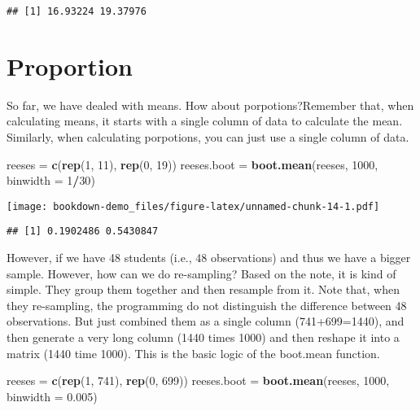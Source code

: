 \documentclass[]{book}
\newenvironment{Shaded}{\begin{snugshade}}{\end{snugshade}}
\newcommand{\DataTypeTok}[1]{\textcolor[rgb]{0.13,0.29,0.53}{#1}}
\newcommand{\DecValTok}[1]{\textcolor[rgb]{0.00,0.00,0.81}{#1}}
\newcommand{\FloatTok}[1]{\textcolor[rgb]{0.00,0.00,0.81}{#1}}
\newcommand{\KeywordTok}[1]{\textcolor[rgb]{0.13,0.29,0.53}{\textbf{#1}}}
\newcommand{\NormalTok}[1]{#1}
\newcommand{\OperatorTok}[1]{\textcolor[rgb]{0.81,0.36,0.00}{\textbf{#1}}}
\newcommand{\StringTok}[1]{\textcolor[rgb]{0.31,0.60,0.02}{#1}}
\begin{document}
\begin{verbatim}
## [1] 16.93224 19.37976
\end{verbatim}

\hypertarget{proportion}{%
\section{Proportion}\label{proportion}}

So far, we have dealed with means. How about porpotions?Remember that, when calculating means, it starts with a single column of data to calculate the mean. Similarly, when calculating porpotions, you can just use a single column of data.

\begin{Shaded}
\begin{Highlighting}[]
\NormalTok{reeses =}\StringTok{ }\KeywordTok{c}\NormalTok{(}\KeywordTok{rep}\NormalTok{(}\DecValTok{1}\NormalTok{, }\DecValTok{11}\NormalTok{), }\KeywordTok{rep}\NormalTok{(}\DecValTok{0}\NormalTok{, }\DecValTok{19}\NormalTok{))}
\NormalTok{reeses.boot =}\StringTok{ }\KeywordTok{boot.mean}\NormalTok{(reeses, }\DecValTok{1000}\NormalTok{, }\DataTypeTok{binwidth =} \DecValTok{1}\OperatorTok{/}\DecValTok{30}\NormalTok{)}
\end{Highlighting}
\end{Shaded}

\texttt{[image: bookdown-demo\_files/figure-latex/unnamed-chunk-14-1.pdf]}

\begin{verbatim}
## [1] 0.1902486 0.5430847
\end{verbatim}

However, if we have 48 students (i.e., 48 observations) and thus we have a bigger sample. However, how can we do re-sampling? Based on the note, it is kind of simple. They group them together and then resample from it. Note that, when they re-sampling, the programming do not distinguish the difference between 48 observations. But just combined them as a single column (741+699=1440), and then generate a very long column (1440 times 1000) and then reshape it into a matrix (1440 time 1000). This is the basic logic of the boot.mean function.

\begin{Shaded}
\begin{Highlighting}[]
\NormalTok{reeses =}\StringTok{ }\KeywordTok{c}\NormalTok{(}\KeywordTok{rep}\NormalTok{(}\DecValTok{1}\NormalTok{, }\DecValTok{741}\NormalTok{), }\KeywordTok{rep}\NormalTok{(}\DecValTok{0}\NormalTok{, }\DecValTok{699}\NormalTok{))}
\NormalTok{reeses.boot =}\StringTok{ }\KeywordTok{boot.mean}\NormalTok{(reeses, }\DecValTok{1000}\NormalTok{, }\DataTypeTok{binwidth =} \FloatTok{0.005}\NormalTok{)}
\end{Highlighting}
\end{Shaded}
\end{document}
